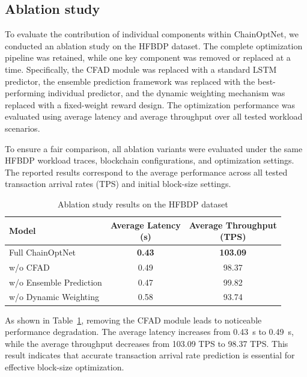 \documentclass[a4paper,fleqn]{cas-dc}
\begin{document}


\subsection{Ablation study}
\vspace{6pt}
To evaluate the contribution of individual components within ChainOptNet, we conducted an ablation study on the HFBDP dataset. The complete optimization pipeline was retained, while one key component was removed or replaced at a time. Specifically, the CFAD module was replaced with a standard LSTM predictor, the ensemble prediction framework was replaced with the best-performing individual predictor, and the dynamic weighting mechanism was replaced with a fixed-weight reward design. The optimization performance was evaluated using average latency and average throughput over all tested workload scenarios.

To ensure a fair comparison, all ablation variants were evaluated under the same HFBDP workload traces, blockchain configurations, and optimization settings. The reported results correspond to the average performance across all tested transaction arrival rates (TPS) and initial block-size settings.

\begin{table}[!htbp]
	\centering
	\footnotesize
	\caption{Ablation study results on the HFBDP dataset}
	\label{tab:ablation_study}
	\setlength{\tabcolsep}{6pt}
	\begin{tabular}{@{}lcc@{}}
		\toprule
		Model & \shortstack{Average Latency \\ (s)} & \shortstack{Average Throughput \\ (TPS)} \\
		\midrule
		Full ChainOptNet & \textbf{0.43} & \textbf{103.09} \\
		w/o CFAD & 0.49 & 98.37 \\
		w/o Ensemble Prediction & 0.47 & 99.82 \\
		w/o Dynamic Weighting & 0.58 & 93.74 \\
		\bottomrule
	\end{tabular}
\end{table}

As shown in Table~\ref{tab:ablation_study}, removing the CFAD module leads to noticeable performance degradation. The average latency increases from 0.43~s to 0.49~s, while the average throughput decreases from 103.09 TPS to 98.37 TPS. This result indicates that accurate transaction arrival rate prediction is essential for effective block-size optimization.
\end{document}

